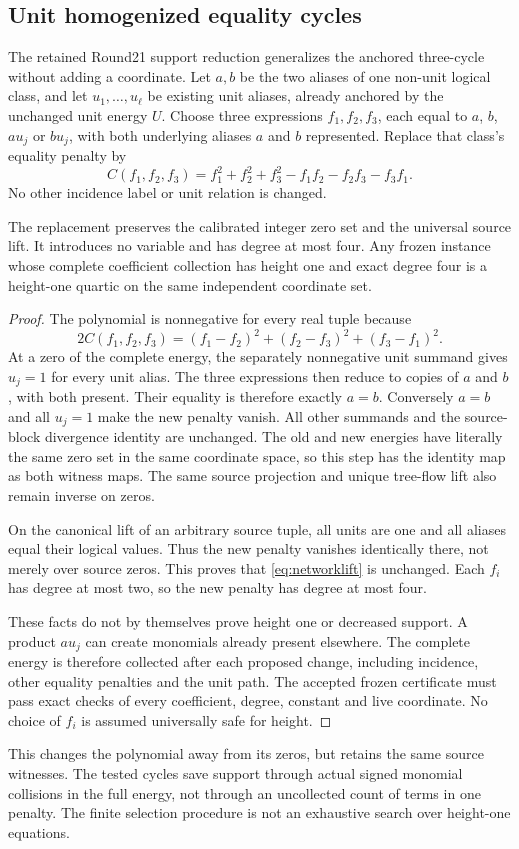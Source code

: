 \subsection{Unit homogenized equality cycles}
The retained Round21 support reduction generalizes the anchored three-cycle without
adding a coordinate. Let $a,b$ be the two aliases of one non-unit logical
class, and let $u_1,\ldots,u_\ell$ be existing unit aliases, already
anchored by the unchanged unit energy $U$. Choose three expressions
$f_1,f_2,f_3$, each equal to $a$, $b$, $au_j$ or $bu_j$, with both
underlying aliases $a$ and $b$ represented. Replace that class's equality
penalty by
\begin{equation}\label{eq:unit-cycle}
 C(f_1,f_2,f_3)=f_1^2+f_2^2+f_3^2-f_1f_2-f_2f_3-f_3f_1.
\end{equation}
No other incidence label or unit relation is changed.

\begin{theorem}\label{thm:unit-cycle}
The replacement preserves the calibrated integer zero set and the
universal source lift. It introduces no variable and has degree at most
four. Any frozen instance whose complete coefficient collection has
height one and exact degree four is a height-one quartic on the same
independent coordinate set.
\end{theorem}
\begin{proof}
The polynomial is nonnegative for every real tuple because
\[
 2C(f_1,f_2,f_3)=(f_1-f_2)^2+(f_2-f_3)^2+(f_3-f_1)^2.
\]
At a zero of the complete energy, the separately nonnegative unit
summand gives $u_j=1$ for every unit alias. The three expressions then
reduce to copies of $a$ and $b$, with both present. Their equality is
therefore exactly $a=b$. Conversely $a=b$ and all $u_j=1$ make the
new penalty vanish. All other summands and the source-block divergence
identity are unchanged. The old and new energies have literally the same zero set in the same
coordinate space, so this step has the identity map as both witness maps.
The same source projection and unique tree-flow lift also remain inverse
on zeros.

On the canonical lift of an arbitrary source tuple, all units are one
and all aliases equal their logical values. Thus the new penalty
vanishes identically there, not merely over source zeros. This proves
that \eqref{eq:networklift} is unchanged. Each $f_i$ has degree at most
two, so the new penalty has degree at most four.

These facts do not by themselves prove height one or decreased support.
A product $au_j$ can create monomials already present elsewhere. The
complete energy is therefore collected after each proposed change,
including incidence, other equality penalties and the unit path.
The accepted frozen certificate must pass exact checks of every
coefficient, degree, constant and live coordinate. No choice of
$f_i$ is assumed universally safe for height.
\end{proof}
This changes the polynomial away from its zeros, but retains the same
source witnesses. The tested cycles save support through actual signed
monomial collisions in the full energy, not through an uncollected
count of terms in one penalty. The finite selection procedure is not an
exhaustive search over height-one equations.
